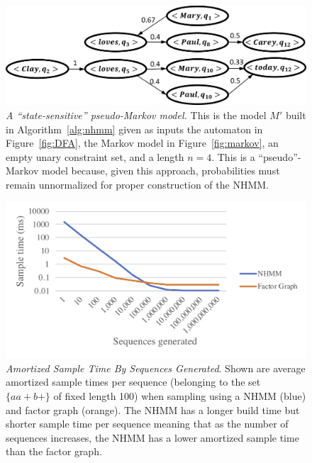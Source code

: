 \documentclass[phd,electronic,oneside,twosidetoc,letterpaper,chaptercenter,parttop,lof,lot]{byumsphd}
\begin{document}
\begin{figure}
    \centering
    \includegraphics[width=\linewidth]{ssMarkov}
    \caption{\textit{A ``state-sensitive'' pseudo-Markov model.} This is the model $M'$ built in Algorithm~\ref{alg:nhmm} given as inputs the automaton in Figure~\ref{fig:DFA}, the Markov model in Figure~\ref{fig:markov}, an empty unary constraint set, and a length $n=4$. This is a ``pseudo''-Markov model because, given this approach, probabilities must remain unnormalized for proper construction of the NHMM.}
    \label{fig:ssMarkov}
\end{figure}

\begin{figure}
    \centering
    \includegraphics[width=\linewidth]{sampleTimeByCountlegend}
    \caption{\textit{Amortized Sample Time By Sequences Generated}. Shown are average amortized sample times per sequence (belonging to the set $\{aa+b+\}$ of fixed length 100) when sampling using a NHMM (blue) and factor graph (orange). The NHMM has a longer build time but shorter sample time per sequence meaning that as the number of sequences increases, the NHMM has a lower amortized sample time than the factor graph.}
    \label{fig:sampleTimeByCount}
\end{figure}
\end{document}
